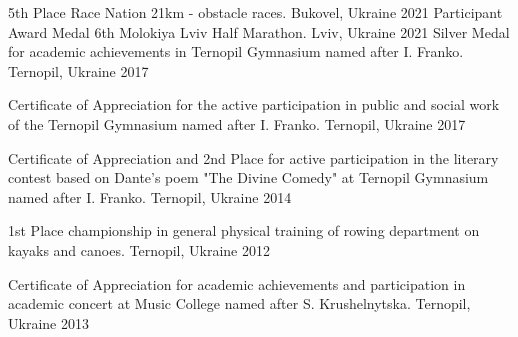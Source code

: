 



\begin{cvhonors}
  \cvhonor
    {5th Place} %
    {Race Nation 21km - obstacle races.} %
    {Bukovel, Ukraine} %
    {2021} %
  \cvhonor
    {Participant Award Medal} %
    {6th Molokiya Lviv Half Marathon.} %
    {Lviv, Ukraine} %
    {2021} %
  \cvhonor
    {Silver Medal} %
    {for academic achievements in Ternopil Gymnasium named after I. Franko.} %
    {Ternopil, Ukraine} %
    {2017} %

  \cvhonor
    {Certificate of Appreciation} %
    {for the active participation in public and social work of the Ternopil Gymnasium named after I. Franko.} %
    {Ternopil, Ukraine} %
    {2017} %


  \cvhonor
    {Certificate of Appreciation and 2nd Place} %
    {for active participation in the literary contest based on Dante's poem "The Divine Comedy" at Ternopil Gymnasium named after I. Franko.} %
    {Ternopil, Ukraine} %
    {2014} %



  \cvhonor
    {1st Place} %
    {championship in general physical training of rowing department on kayaks and canoes.} %
    {Ternopil, Ukraine} %
    {2012} %

  \cvhonor
    {Certificate of Appreciation} %
    {for academic achievements and participation in academic concert at Music College named after S. Krushelnytska.} %
    {Ternopil, Ukraine} %
    {2013} %


\end{cvhonors}
